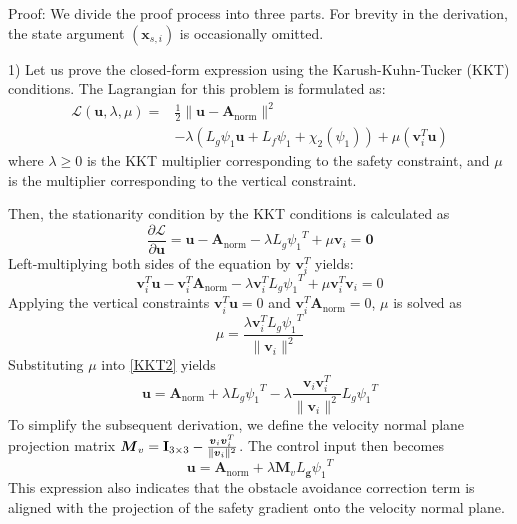 \documentclass[lettersize,journal]{IEEEtran}
\begin{document}
Proof: We divide the proof process into three parts. For brevity in the derivation, the state argument $({\boldsymbol{x}}_{s,i})$ is occasionally omitted.

1) Let us prove the closed-form expression using the Karush-Kuhn-Tucker (KKT) conditions.
The Lagrangian for this problem is formulated as:
\begin{equation}
	\begin{split}
		\mathcal{L}({\boldsymbol{u}}, \lambda, \mu) = & \frac{1}{2} \| {\boldsymbol{u}} - {\boldsymbol{A}}_{\mathrm{norm}} \|^2 \\
		& - \lambda \left(L_{{g}}{\psi _1} {\boldsymbol{u}} + L_{{f}}{\psi _1} + {\chi _2}({\psi _1}) \right) + \mu({\boldsymbol{v}}_i^T {\boldsymbol{u}})
	\end{split}
\end{equation}
where $\lambda \ge 0$ is the KKT multiplier corresponding to the safety constraint, and $\mu$ is the multiplier corresponding to the vertical constraint.

Then, the stationarity condition by the KKT conditions is calculated as
\begin{equation}
	\frac{\partial \mathcal{L}}{\partial {\boldsymbol{u}}} = {\boldsymbol{u}} - {\boldsymbol{A}}_{\mathrm{norm}} - \lambda L_{{g}}{\psi _1}^T + \mu {\boldsymbol{v}}_i = \boldsymbol{0}
\end{equation}
Left-multiplying both sides of the equation by ${\boldsymbol{v}}_i^T$ yields:
\begin{equation}
	\label{KKT2}
	{\boldsymbol{v}}_i^T {\boldsymbol{u}} - {\boldsymbol{v}}_i^T {\boldsymbol{A}}_{\mathrm{norm}} - \lambda {\boldsymbol{v}}_i^T L_{{g}}{\psi _1}^T + \mu {\boldsymbol{v}}_i^T {\boldsymbol{v}}_i = 0
\end{equation}
Applying the vertical constraints ${\boldsymbol{v}}_i^T {\boldsymbol{u}} = 0$ and ${\boldsymbol{v}}_i^T {\boldsymbol{A}}_{\mathrm{norm}}= 0$, $\mu$ is solved as
\begin{equation}
	\mu = \frac{\lambda {\boldsymbol{v}}_i^T L_{{g}}{\psi _1}^T}{\|{\boldsymbol{v}}_i\|^2}
\end{equation}
Substituting $\mu$ into \eqref{KKT2} yields
\begin{equation}
	{\boldsymbol{u}} = {\boldsymbol{A}}_{\mathrm{norm}} + \lambda L_{{g}}{\psi _1}^T - \lambda \frac{{\boldsymbol{v}}_i {\boldsymbol{v}}_i^T}{\|{\boldsymbol{v}}_i\|^2} L_{{g}}{\psi _1}^T
\end{equation}
To simplify the subsequent derivation, we define the velocity normal plane projection matrix ${\boldsymbol{M}}_v = {\bf{I}}_{3\times3} - \frac{{\boldsymbol{v}}_i {\boldsymbol{v}}_i^T}{\|{\boldsymbol{v}}_i\|^2}$. The control input then becomes
\begin{equation}
	\label{u_lambda}
	{\boldsymbol{u}} = {\boldsymbol{A}}_{\mathrm{norm}} + \lambda {\boldsymbol{M}}_v L_{\boldsymbol{g}}{\psi _1}^T
\end{equation}
This expression also indicates that the obstacle avoidance correction term is aligned with the projection of the safety gradient onto the velocity normal plane.
\end{document}
